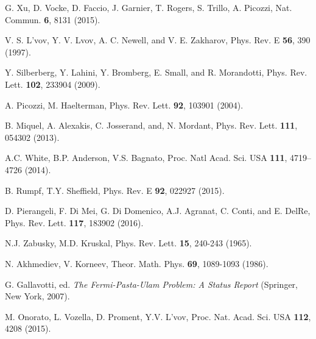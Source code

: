 \documentclass[pra,twocolumn,showpacs,preprintnumbers,amsmath,amssymb]{revtex4}
\begin{document}
\begin{thebibliography}{99}
G. Xu, D. Vocke, D. Faccio, J. Garnier, T. Rogers, S. Trillo, A. Picozzi, 
Nat. Commun. {\bf 6}, 8131 (2015).

V. S. L'vov, Y. V. Lvov, A. C. Newell, and V. E. Zakharov,
Phys. Rev. E {\bf 56}, 390 (1997).

Y. Silberberg, Y. Lahini, Y. Bromberg, E. Small, and
R. Morandotti, 
Phys. Rev. Lett. {\bf 102}, 233904 (2009).


A. Picozzi, M. Haelterman,
Phys. Rev. Lett. {\bf 92}, 103901 (2004).


B. Miquel, A. Alexakis, C. Josserand, and, N. Mordant,
Phys. Rev. Lett. {\bf 111}, 054302 (2013).

A.C. White, B.P. Anderson, V.S. Bagnato, 
Proc. Natl Acad. Sci. USA {\bf 111}, 4719--4726 (2014).

B. Rumpf, T.Y. Sheffield,
Phys. Rev. E {\bf 92}, 022927 (2015).

D. Pierangeli, F. Di Mei, G. Di Domenico, A.J. Agranat, C. Conti, and E. DelRe,
Phys. Rev. Lett. {\bf 117}, 183902 (2016).


N.J. Zabusky, M.D. Kruskal, 
Phys. Rev. Lett. {\bf 15}, 240-243 (1965).

N. Akhmediev, V. Korneev,
Theor. Math. Phys. {\bf 69}, 1089-1093 (1986).


G. Gallavotti, ed. {\it The Fermi-Pasta-Ulam Problem: A Status Report}
(Springer, New York, 2007).


M. Onorato, L. Vozella, D. Proment, Y.V. L'vov,
Proc. Nat. Acad. Sci. USA {\bf 112}, 4208 (2015).


\end{thebibliography}
\end{document}
